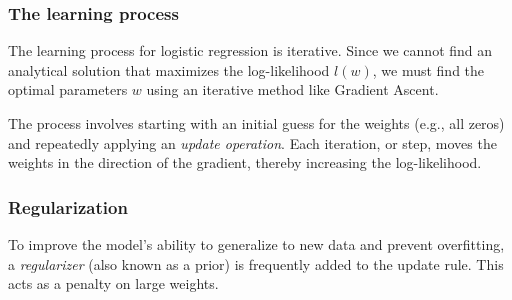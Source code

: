 \subsubsection{The learning process}

The learning process for logistic regression is iterative. Since we cannot find an analytical solution that maximizes the log-likelihood $l(w)$, we must find the optimal parameters $w$ using an iterative method like Gradient Ascent.

The process involves starting with an initial guess for the weights (e.g., all zeros) and repeatedly applying an \textit{update operation}. Each iteration, or step, moves the weights in the direction of the gradient, thereby increasing the log-likelihood.


\subsubsection{Regularization}
To improve the model's ability to generalize to new data and prevent overfitting, a \textit{regularizer} (also known as a prior) is frequently added to the update rule. This acts as a penalty on large weights.

